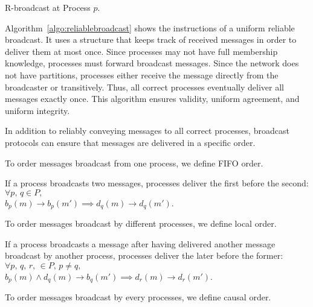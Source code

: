 \begin{algorithm}[h]
  
  \caption{\label{algo:reliablebroadcast}R-broadcast at Process $p$.}
\end{algorithm}

Algorithm~\ref{algo:reliablebroadcast} shows the instructions of a uniform
reliable broadcast. It uses a structure that keeps track of received messages in
order to deliver them at most once. 
Since processes may not have full membership knowledge, processes must forward
broadcast messages. Since the network does not have partitions, processes either
receive the message directly from the broadcaster or transitively. Thus, all
correct processes eventually deliver all messages exactly once. This algorithm
ensures validity, uniform agreement, and uniform integrity.

In addition to reliably conveying messages to all correct processes, broadcast
protocols can ensure that messages are delivered in a specific order.

To order messages broadcast from one process, we define FIFO order.

\begin{definition}
  If a process broadcasts two messages, processes deliver the first before the
  second:\\
  $\forall p,\,q \in P,\,$\\$b_p(m) \rightarrow b_p(m') \implies d_q(m) \rightarrow
  d_q(m')$.
\end{definition}

To order messages broadcast by different processes, we define local order.

\begin{definition}
  If a process broadcasts a message after having delivered another message
  broadcast by another process, processes deliver the later before the former:\\
  $\forall p,\,q,\,r,\, \in P,\,p\neq q,\,$\\$b_p(m) \wedge d_q(m) \rightarrow b_q(m') \implies d_r(m) \rightarrow d_r(m')$.
\end{definition}

To order messages broadcast by every processes, we define causal order.

